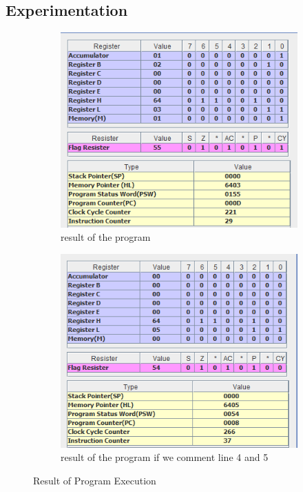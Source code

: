 \documentclass[a4paper]{article} %
\begin{document}
    \subsection{Experimentation}
    \begin{figure}[h!]
        \centering
        \begin{subfigure}[b]{0.49\linewidth}
            \centering
            \includegraphics[width=\linewidth]{Assignment 4/1_POST/yes_stuck.png}
            \caption{result of the program}
            \label{fg9a}
        \end{subfigure}
        \begin{subfigure}[b]{0.49\linewidth}
            \centering
            \includegraphics[width=\linewidth]{Assignment 4/1_POST/no_stuck.png}
            \caption{result of the program if we comment line 4 and 5}
            \label{fg9b}
        \end{subfigure}
        \caption{Result of Program Execution}
        \label{fg9}
    \end{figure}
\end{document}

